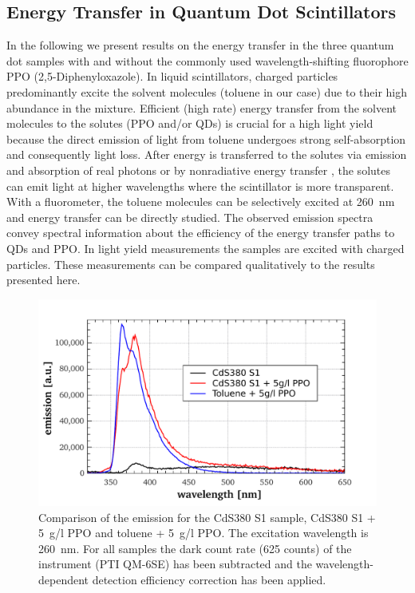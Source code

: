 \documentclass[cits]{JINST}
\begin{document}
\subsection{Energy Transfer in Quantum Dot Scintillators}
In the following we present results on the energy transfer in the three quantum dot samples with and without the commonly used wavelength-shifting fluorophore PPO (2,5-Diphenyloxazole). In liquid scintillators, charged particles predominantly excite the solvent molecules (toluene in our case) due to their high abundance in the mixture. Efficient (high rate) energy transfer from the solvent molecules to the solutes (PPO and/or QDs) is crucial for a high light yield because the direct emission of light from toluene undergoes strong self-absorption and consequently light loss. After energy is transferred to the solutes via emission and absorption of real photons or by nonradiative energy transfer \cite{foerster}, the solutes can emit light at higher wavelengths where the scintillator is more transparent. With a fluorometer, the toluene molecules can be selectively excited at 260~nm and energy transfer can be directly studied. The observed emission spectra convey spectral information about the efficiency of the energy transfer paths to QDs and PPO. In light yield measurements \cite{mitpaper} the samples are excited with charged particles. These measurements can be compared qualitatively to the results presented here.

\begin{figure}
      \begin{center}
        \includegraphics[scale=0.44]{graphs/G_QD380_ex260_corr.pdf}
        \caption[]{Comparison of the emission for the CdS380 S1 sample, CdS380 S1 + 5~g/l PPO and toluene + 5~g/l PPO. The excitation wavelength is 260~nm. For all samples the dark count rate (625 counts) of the instrument (PTI QM-6SE) has been subtracted and the wavelength-dependent detection efficiency correction has been applied. \label{G_QD380_ex260_corr}}
        \end{center}
\end{figure}
\end{document}
